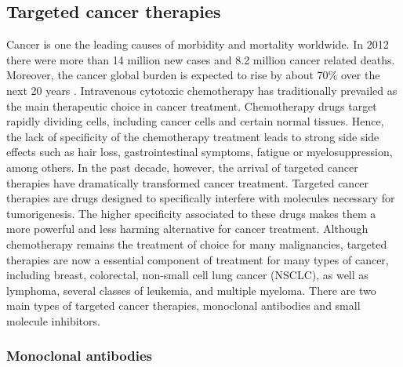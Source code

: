 \documentclass[12pt, b5paper,twoside]{tesi_upf}
\begin{document}
\subsection{Targeted cancer therapies}

\par Cancer is one the leading causes of morbidity and mortality worldwide. In 2012 there were more than 14 million new cases and 8.2 million cancer related deaths. Moreover, the cancer global burden is expected to rise by about 70$\%$ over the next 20 years \cite{WHO_CANCER}. Intravenous cytotoxic chemotherapy has traditionally prevailed as the main therapeutic choice in cancer treatment. Chemotherapy drugs target rapidly dividing cells, including cancer cells and certain normal tissues.  Hence, the lack of specificity of the chemotherapy treatment leads to strong side side effects such as hair loss, gastrointestinal symptoms, fatigue or myelosuppression, among others.  In the past decade, however, the arrival of targeted cancer therapies have dramatically transformed cancer treatment. Targeted cancer therapies are drugs designed to specifically interfere with molecules necessary for tumorigenesis. The higher specificity associated to these drugs makes them a more powerful and less harming alternative for cancer treatment. Although chemotherapy remains the treatment of choice for many malignancies, targeted therapies are now a essential component of treatment for many types of cancer, including breast, colorectal, non-small cell lung cancer (NSCLC), as well as lymphoma, several classes of leukemia, and multiple myeloma. There are two main types of targeted cancer therapies, monoclonal antibodies and small molecule inhibitors.

\subsubsection{Monoclonal antibodies}
\end{document}
